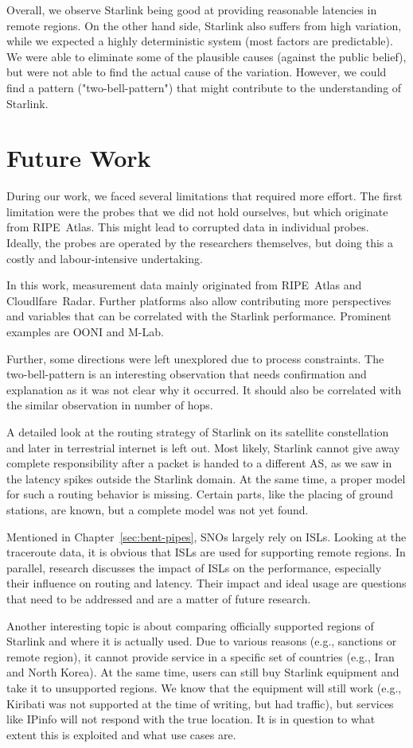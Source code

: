 Overall, we observe Starlink being good at providing reasonable latencies in
remote regions. On the other hand side, Starlink also suffers from high
variation, while we expected a highly deterministic system (most factors are
predictable). We were able to eliminate some of the plausible causes (against
the public belief), but were not able to find the actual cause of the
variation. However, we could find a pattern ("two-bell-pattern") that might
contribute to the understanding of Starlink.

\section{Future Work}

During our work, we faced several limitations that required more effort. The
first limitation were the probes that we did not hold ourselves, but which
originate from RIPE~Atlas. This might lead to corrupted data in individual
probes. Ideally, the probes are operated by the researchers themselves, but
doing this a costly and labour-intensive undertaking.


In this work, measurement data mainly originated from RIPE~Atlas and
Cloudlfare~Radar. Further platforms also allow contributing more perspectives
and variables that can be correlated with the Starlink performance. Prominent
examples are OONI and M-Lab.

Further, some directions were left unexplored due to process constraints. The
two-bell-pattern is an interesting observation that needs confirmation and
explanation as it was not clear why it occurred. It should also be correlated
with the similar observation in number of hops.

A detailed look at the routing strategy of Starlink on its satellite
constellation and later in terrestrial internet is left out. Most likely,
Starlink cannot give away complete responsibility after a packet is handed to a
different AS, as we saw in the latency spikes outside the Starlink domain. At
the same time, a proper model for such a routing behavior is missing. Certain
parts, like the placing of ground stations, are known, but a complete model was
not yet found.

Mentioned in Chapter~\ref{sec:bent-pipes}, \ac{SNO}s largely rely on \ac{ISL}s.
Looking at the traceroute data, it is obvious that \ac{ISL}s are used for
supporting remote regions. In parallel, research discusses the impact of
\ac{ISL}s on the performance, especially their influence on routing and
latency. Their impact and ideal usage are questions that need to be addressed
and are a matter of future research.

Another interesting topic is about comparing officially supported regions of
Starlink and where it is actually used. Due to various reasons (e.g., sanctions
or remote region), it cannot provide service in a specific set of countries
(e.g., Iran and North Korea). At the same time, users can still buy Starlink
equipment and take it to unsupported regions. We know that the equipment will
still work (e.g., Kiribati was not supported at the time of writing, but had
traffic), but services like IPinfo will not respond with the true location. It
is in question to what extent this is exploited and what use cases are.
